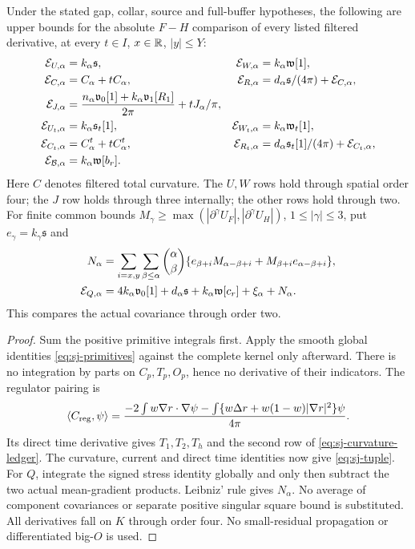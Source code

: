\begin{theorem}\label{thm:sj-transfer}
Under the stated gap, collar, source and full-buffer hypotheses, the
following are upper bounds for the absolute $F-H$ comparison of every
listed filtered derivative, at every $t\in I$, $x\in\mathbb R$, $|y|\le Y$:
\begin{align}
 \mathcal E_{U,\alpha}&=k_\alpha\mathfrak s,&
 \mathcal E_{W,\alpha}&=k_\alpha\mathfrak w[1],\notag\\
 \mathcal E_{C,\alpha}&=C_\alpha+tC_\alpha,&
 \mathcal E_{R,\alpha}&=d_\alpha\mathfrak s/(4\pi)+\mathcal E_{C,\alpha},\notag\\
 \mathcal E_{J,\alpha}&=\frac{n_\alpha\mathfrak v_0[1]
                   +k_\alpha\mathfrak v_1[R_1]}{2\pi}+tJ_\alpha/\pi,\notag\\
 \mathcal E_{U_t,\alpha}&=k_\alpha\mathfrak s_t[1],&
 \mathcal E_{W_t,\alpha}&=k_\alpha\mathfrak w_t[1],\notag\\
 \mathcal E_{C_t,\alpha}&=C^t_\alpha+tC^t_\alpha,&
 \mathcal E_{R_t,\alpha}&=d_\alpha\mathfrak s_t[1]/(4\pi)
                                        +\mathcal E_{C_t,\alpha},\notag\\
 \mathcal E_{\mathcal B,\alpha}&=k_\alpha\mathfrak w[b_r].
 \label{eq:sj-tuple}
\end{align}
Here $C$ denotes filtered total curvature. The $U,W$ rows hold through
spatial order four; the $J$ row holds through three internally; the
other rows hold through two. For finite common bounds
$M_\gamma\ge\max(|\partial^\gamma U_F|,|\partial^\gamma U_H|)$,
$1\le|\gamma|\le3$, put $e_\gamma=k_\gamma\mathfrak s$ and
\begin{align}
 N_\alpha&=\sum_{i=x,y}\sum_{\beta\le\alpha}\binom\alpha\beta
   \{e_{\beta+i}M_{\alpha-\beta+i}+M_{\beta+i}e_{\alpha-\beta+i}\},\notag\\
 \mathcal E_{Q,\alpha}&=4k_\alpha\mathfrak v_0[1]+d_\alpha\mathfrak s
                    +k_\alpha\mathfrak w[c_r]+\xi_\alpha+N_\alpha.
 \label{eq:sj-covariance}
\end{align}
This compares the actual covariance through order two.
\end{theorem}
\begin{proof}
Sum the positive primitive integrals first. Apply the smooth global
identities \eqref{eq:sj-primitives} against the complete kernel only
afterward. There is no integration by parts on $C_p,T_p,O_p$, hence
no derivative of their indicators. The regulator pairing is
\[
 \langle C_{\rm reg},\psi\rangle
 =\frac{-2\int w\nabla r\cdot\nabla\psi
            -\int\{w\Delta r+w(1-w)|\nabla r|^2\}\psi}{4\pi}.
\]
Its direct time derivative gives $T_1,T_2,T_h$ and the second row of
\eqref{eq:sj-curvature-ledger}. The curvature, current and direct time
identities now give \eqref{eq:sj-tuple}. For $Q$, integrate the signed
stress identity globally and only then subtract the two actual
mean-gradient products. Leibniz' rule gives $N_\alpha$.
No average of component covariances or separate positive singular
square bound is substituted. All derivatives fall on $K$ through order
four. No small-residual propagation or differentiated big-$O$ is used.
\end{proof}
